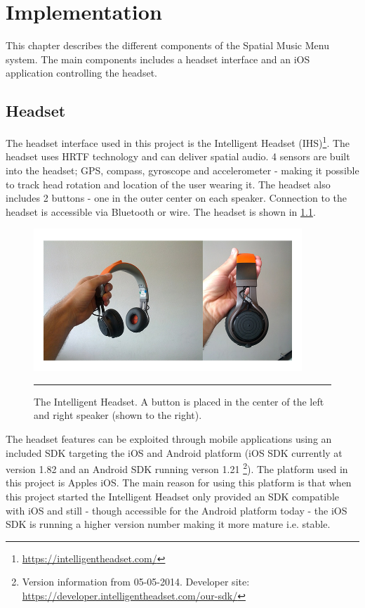\chapter{Implementation}
This chapter describes the different components of the Spatial Music Menu system. The main components includes a headset interface and an iOS application controlling the headset.


\section{Headset}
The headset interface used in this project is the Intelligent Headset (IHS)\footnote{\url{https://intelligentheadset.com/}}. The headset uses HRTF technology and can deliver spatial audio. 4 sensors are built into the headset; GPS, compass, gyroscope and accelerometer - making it possible to track head rotation and location of the user wearing it. The headset also includes 2 buttons - one in the outer center on each speaker. Connection to the headset is accessible via Bluetooth or wire. The headset is shown in \ref{fig:headset}.

\begin{figure}[h]
	\centering
		\includegraphics[width=0.9\textwidth,height=\textheight,keepaspectratio]{./Figures/headset.jpg}
		\rule{35em}{1pt}
	\caption[The Intelligent Headset]{The Intelligent Headset. A button is placed in the center of the left and right speaker (shown to the right).}
	\label{fig:headset}
\end{figure}

The headset features can be exploited through mobile applications using an included SDK targeting the iOS and Android platform (iOS SDK currently at version 1.82 and an Android SDK running verson 1.21 \footnote{Version information from 05-05-2014. Developer site: \url{https://developer.intelligentheadset.com/our-sdk/}}). The platform used in this project is Apples iOS. The main reason for using this platform is that when this project started the Intelligent Headset only provided an SDK compatible with iOS and still - though accessible for the Android platform today - the iOS SDK is running a higher version number making it more mature i.e. stable.

